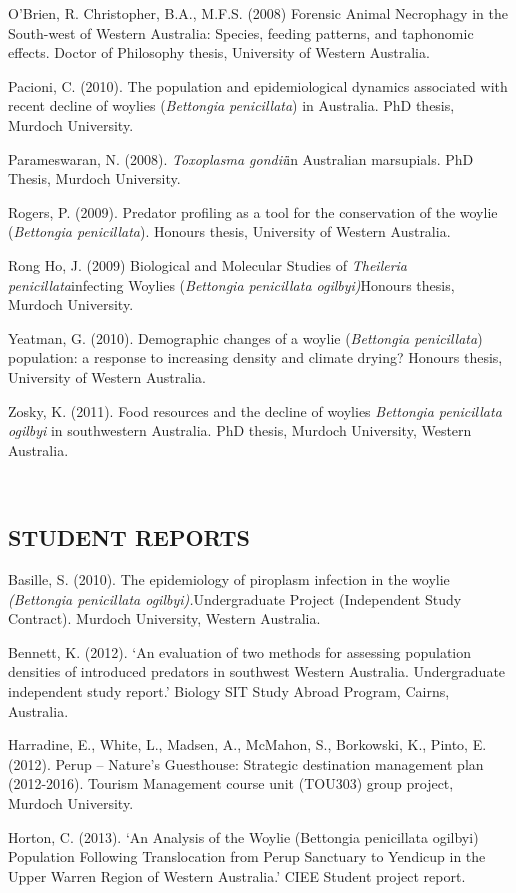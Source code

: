 \documentclass[version=last,
    paper=a4,                               %
    10pt,                                   %
    dvipsnames,
    oneside,                              %
    headings=openany,                       %
    open=any,
    BCOR=7mm,                               %
    DIV=15,     %
]{scrbook}
\begin{document}
O'Brien, R. Christopher, B.A., M.F.S. (2008) Forensic Animal Necrophagy
in the South-west of Western Australia: Species, feeding patterns, and
taphonomic effects. Doctor of Philosophy thesis, University of Western
Australia.

Pacioni, C. (2010). The population and epidemiological dynamics
associated with recent decline of woylies (\emph{Bettongia penicillata})
in Australia. PhD thesis, Murdoch University.

Parameswaran, N. (2008). \emph{Toxoplasma gondii}in Australian
marsupials. PhD Thesis, Murdoch University.

Rogers, P. (2009). Predator profiling as a tool for the conservation of
the woylie (\emph{Bettongia penicillata}). Honours thesis, University of
Western Australia.

Rong Ho, J. (2009) Biological and Molecular Studies of \emph{Theileria
penicillata}infecting Woylies (\emph{Bettongia penicillata
ogilbyi)}Honours thesis, Murdoch University.

Yeatman, G. (2010). Demographic changes of a woylie (\emph{Bettongia
penicillata}) population: a response to increasing density and climate
drying? Honours thesis, University of Western Australia.

Zosky, K. (2011). Food resources and the decline of woylies
\emph{Bettongia penicillata ogilbyi} in southwestern Australia. PhD
thesis, Murdoch University, Western Australia.

~

\subsection{STUDENT REPORTS}

Basille, S. (2010). The epidemiology of piroplasm infection in the
woylie \emph{(Bettongia penicillata ogilbyi).}Undergraduate Project
(Independent Study Contract). Murdoch University, Western Australia.

Bennett, K. (2012). `An evaluation of two methods for assessing
population densities of introduced predators in southwest Western
Australia. Undergraduate independent study report.' Biology SIT Study
Abroad Program, Cairns, Australia.

Harradine, E., White, L., Madsen, A., McMahon, S., Borkowski, K., Pinto,
E. (2012). Perup -- Nature's Guesthouse: Strategic destination
management plan (2012-2016). Tourism Management course unit (TOU303)
group project, Murdoch University.

Horton, C. (2013). `An Analysis of the Woylie (Bettongia penicillata
ogilbyi) Population Following Translocation from Perup Sanctuary to
Yendicup in the Upper Warren Region of Western Australia.' CIEE Student
project report.
\end{document}
